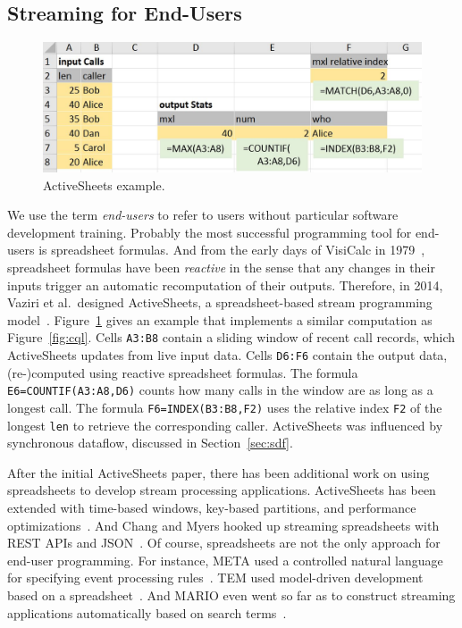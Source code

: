 \subsection{Streaming for End-Users}\label{sec:eup} %

\begin{figure}[!h]
\centerline{\includegraphics[width=\columnwidth]{CallStats.jpg}}
\vspace*{-4mm}
\caption{\label{fig:activesheets}ActiveSheets example.}
\end{figure}

We use the term \emph{end-users} to refer to users without particular
software development training. Probably the most successful
programming tool for end-users is spreadsheet formulas. And from the
early days of VisiCalc in 1979~\cite{bricklin_frankston_1979},
spreadsheet formulas have been \emph{reactive} in the sense that any
changes in their inputs trigger an automatic recomputation of their
outputs. Therefore, in 2014, Vaziri et al.\ designed ActiveSheets, a
spreadsheet-based stream programming model~\cite{vaziri_et_al_2014}.
Figure~\ref{fig:activesheets} gives an example that implements a
similar computation as Figure~\ref{fig:cql}.
Cells \lstinline{A3:B8} contain a sliding window of recent call
records, which ActiveSheets updates from live input data. Cells
\lstinline{D6:F6} contain the output data, \mbox{(re-)}com\-pu\-ted
using reactive spreadsheet formulas. The formula
\mbox{\lstinline{E6=COUNTIF(A3:A8,D6)}} counts how many calls in the
window are as long as a longest call. The formula
\mbox{\lstinline{F6=INDEX(B3:B8,F2)}} uses the relative index \lstinline{F2}
of the longest \lstinline{len} to retrieve the corresponding
caller.  ActiveSheets was influenced by
synchronous dataflow, discussed in Section~\ref{sec:sdf}.

After the initial ActiveSheets paper, there has been additional work
on using spreadsheets to develop stream processing applications.
ActiveSheets has been extended with time-based windows, key-based
partitions, and performance optimizations~\cite{hirzel_et_al_2016}.
And Chang and Myers hooked up streaming spreadsheets with REST APIs and
JSON~\cite{chang_myers_2015}.  Of course, spreadsheets are not the
only approach for end-user programming. For instance, META used a
controlled natural language for specifying event processing
rules~\cite{arnold_et_al_2016}. TEM used model-driven development
based on a spreadsheet~\cite{etzion_et_al_2016}. And MARIO even went
so far as to construct streaming applications automatically based on
search terms~\cite{riabov_et_al_2008}.
